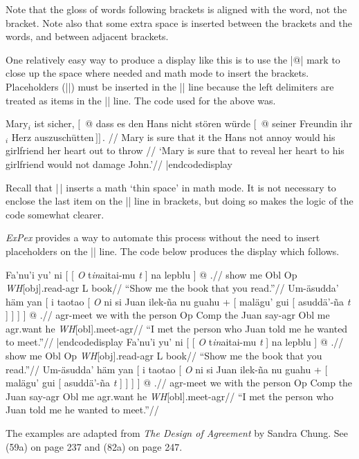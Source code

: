 \noindent Note that the gloss of words following brackets is
aligned with the word, not the bracket.  Note also that some
extra space is inserted between the brackets and the words, and
between adjacent brackets.

One relatively easy way to produce a display like this is to use
the |@| mark to close up the space where needed and math mode to
insert the brackets.  Placeholders (|{}|) must be inserted in the
|\glb| line because the left delimiters are treated as items in
the |\gla| line.  The code used for the above was.

\codedisplay
\ex[glstyle=wrap]
\begingl
\gla Mary$_i$ ist sicher, $[\,$ @ dass es den Hans nicht st\"oren
w\"urde $[\,$ @ seiner Freundin ihr$_i$ Herz
{auszusch\"utten$\,]]\,.$} //
\glb Mary is sure {} that it the Hans not annoy would {} his
girlfriend her heart {out to throw} //
\glft `Mary is sure that to reveal her heart to his girlfriend
would not damage John.'//
\endgl
\xe
|endcodedisplay

\noindent Recall that |\,| inserts a math `thin space' in math
mode. It is not necessary to enclose the last item on the |\gla|
line in brackets, but doing so makes the logic of the code
somewhat clearer.

{\it ExPex\/} provides a way to automate this process without the
need to insert placeholders on the |\glb| line. The code below
produces the display which follows.

\codedisplay
\pex[glstyle=wrap,everygla=,nopreamble]
\a \begingl       %
\gla Fa'nu'i yu' ni [ [ {\it O} t{\it in\/}aitai-mu {\it t\/} ] na
lepblu ] @ .//
\glb show me Obl Op {\it WH\/}[obj].read-agr {} L book//
\glft ``Show me the book that you read.''//
\endgl
\a \begingl       %
\gla Um-\"asudda' h\"am yan [ i taotao [ {\it O\/} ni si Juan
ilek-\~na nu guahu + [ mal\"agu' gui [ asudd\"a'-\~na {\it
t\/} ] ] ] ] @ .//
\glb agr-meet we with the person Op Comp the Juan say-agr Obl me
agr.want he {\it WH\/}[obl].meet-agr//
\glft ``I met the person who Juan told me he wanted to meet.''//
\endgl
\xe
|endcodedisplay
\framedisplay
\pex[glstyle=wrap,everygla=,nopreamble]
\a \begingl       %
\gla Fa'nu'i yu' ni [ [ {\it O} t{\it in\/}aitai-mu {\it t\/} ] na
lepblu ] @ .//
\glb show me Obl Op {\it WH\/}[obj].read-agr {} L book//
\glft ``Show me the book that you read.''//
\endgl
\a \begingl       %
\gla Um-\"asudda' h\"am yan [ i taotao [ {\it O\/} ni si Juan
ilek-\~na nu guahu + [ mal\"agu' gui [ asudd\"a'-\~na {\it
t\/} ] ] ] ] @ .//
\glb agr-meet we with the person Op Comp the Juan say-agr Obl me
agr.want he {\it WH\/}[obl].meet-agr//
\glft ``I met the person who Juan told me he wanted to meet.''//
\endgl
\xe
\endframedisplay

\noindent The examples are adapted from {\it The Design of
Agreement\/} by Sandra Chung.  See (59a) on page 237 and (82a) on
page 247.


